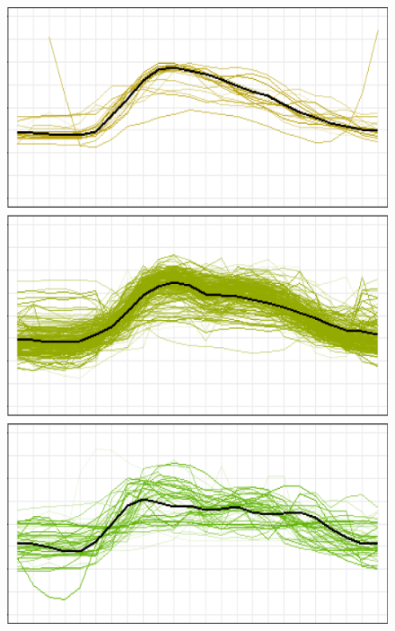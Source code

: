 \documentclass[
	11pt, %
	aspectratio=169, %
]{beamer}
\begin{document}
\begin{frame}
\begin{figure}
\begin{minipage}{0.16\textwidth}
			\includegraphics[width=\linewidth,keepaspectratio]{load_profile_2.png}
		\end{minipage}
		\begin{minipage}{0.16\textwidth}

\end{minipage}
\end{figure}
\end{frame}
\end{document}
